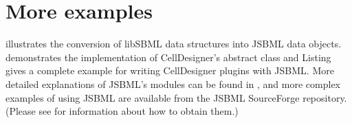 
\section{More examples}

 illustrates the conversion of libSBML data structures
into JSBML data objects.  demonstrates the
implementation of CellDesigner's abstract class  and
Listing~ gives a complete example for writing CellDesigner plugins
with JSBML.   More detailed explanations of JSBML's
modules can be found in , and more complex
examples of using JSBML are available from the JSBML SourceForge repository.
(Please see  for information about how to obtain
them.)
